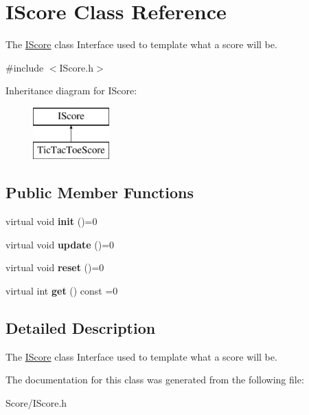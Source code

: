 \hypertarget{class_i_score}{}\section{I\+Score Class Reference}
\label{class_i_score}


The \hyperlink{class_i_score}{I\+Score} class Interface used to template what a score will be.  




{\ttfamily \#include $<$I\+Score.\+h$>$}

Inheritance diagram for I\+Score\+:\begin{figure}[H]
\begin{center}
\leavevmode
\includegraphics[height=2.000000cm]{class_i_score}
\end{center}
\end{figure}
\subsection*{Public Member Functions}
\begin{DoxyCompactItemize}
\item 
\mbox{\label{class_i_score_a89f89e87a6442b5de524dc13248fc39f}} 
virtual void {\bfseries init} ()=0
\item 
\mbox{\label{class_i_score_a80c52a4d42d18dee5d32b1de587dab33}} 
virtual void {\bfseries update} ()=0
\item 
\mbox{\label{class_i_score_aec3d808d09c6bd5ba89ee7ae8166eece}} 
virtual void {\bfseries reset} ()=0
\item 
\mbox{\label{class_i_score_aa47f3fc1c4448f09acfbbee021680e08}} 
virtual int {\bfseries get} () const =0
\end{DoxyCompactItemize}


\subsection{Detailed Description}
The \hyperlink{class_i_score}{I\+Score} class Interface used to template what a score will be. 

The documentation for this class was generated from the following file\+:\begin{DoxyCompactItemize}
\item 
Score/I\+Score.\+h\end{DoxyCompactItemize}
